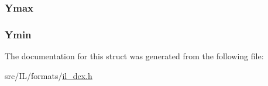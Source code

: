 \hypertarget{struct_d_c_x_h_e_a_d_a593b2ac99a0bf1170bb6074c4fefe15a}{
\subsubsection[{Ymax}]{ Ymax}}\label{struct_d_c_x_h_e_a_d_a593b2ac99a0bf1170bb6074c4fefe15a}
\hypertarget{struct_d_c_x_h_e_a_d_ac7743162b49ccdaace74fceb6e6d76f4}{
\subsubsection[{Ymin}]{ Ymin}}\label{struct_d_c_x_h_e_a_d_ac7743162b49ccdaace74fceb6e6d76f4}


The documentation for this struct was generated from the following file\-:\begin{DoxyCompactItemize}
\item 
src/\-I\-L/formats/\hyperlink{il__dcx_8h}{il\-\_\-dcx.\-h}\end{DoxyCompactItemize}
